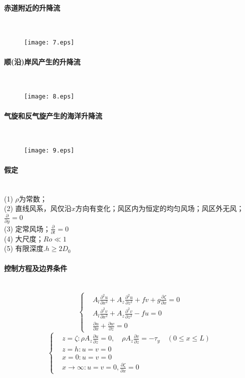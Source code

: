 \documentclass[a4paper,12pt]{article}
\begin{document}
    \paragraph{赤道附近的升降流}~{} \\
    \begin{figure}[H]
        \centering\texttt{[image: 7.eps]}
        \caption*{}
    \end{figure}
    \paragraph{顺(沿)岸风产生的升降流}~{} \\
    \begin{figure}[H]
        \centering\texttt{[image: 8.eps]}
        \caption*{}
    \end{figure}
    \paragraph{气旋和反气旋产生的海洋升降流}~{} \\
    \begin{figure}[H]
        \centering\texttt{[image: 9.eps]}
        \caption*{}
    \end{figure}
    \paragraph{假定}~{}\\
    (1) $\rho$为常数；\\
    (2) 直线风系，风仅沿$x$方向有变化；风区内为恒定的均匀风场；风区外无风；$\displaystyle \frac{\partial }{\partial y}=0$\\
    (3) 定常风场；$\displaystyle \frac{\partial }{\partial t}=0$\\
    (4) 大尺度；$Ro\ll 1$\\
    (5) 有限深度.$h \geq 2D_0$
    \paragraph{控制方程及边界条件}~{}
    \[
        \left\{
        \begin{aligned}
            &A_{l} \frac{\partial^{2} u}{\partial x^{2}}+A_{z} \frac{\partial^{2} u}{\partial z^{2}}+f v+g \frac{\partial \zeta}{\partial x}=0\\
            &A_{l} \frac{\partial^{2} v}{\partial x^{2}}+A_{z} \frac{\partial^{2} v}{\partial z^{2}}-f u=0\\
            &\frac{\partial u}{\partial x}+\frac{\partial w}{\partial z}=0
        \end{aligned}
        \right.
    \]
    \[
        \left\{
        \begin{aligned}
            &z=\zeta:\rho A_{z} \frac{\partial u}{\partial z}=0, \quad \rho A_{z} \frac{\partial v}{\partial z}=-\tau_{y} \quad(0 \leq x \leq L)\\
            &z=h:u=v=0\\
            &x=0:u=v=0\\
            &x\rightarrow\infty:u=v=0,\frac{\partial \zeta}{\partial x}=0
        \end{aligned}
        \right.
    \]
\end{document}
